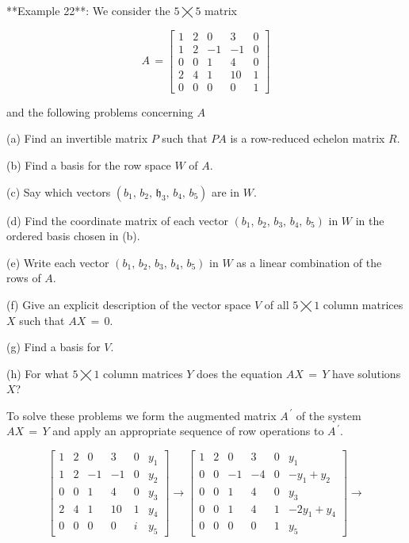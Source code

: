 

**Example 22**: We consider the \(5\bigtimes 5\) matrix

\[A\,=\begin{bmatrix}1&2&0&3&0\\ 1&2&-1&-1&0\\ 0&0&1&4&0\\ 2&4&1&10&1\\ 0&0&0&0&1\end{bmatrix}\]

and the following problems concerning \(A\)

(a) Find an invertible matrix \(P\) such that \(PA\) is a row-reduced echelon matrix \(R\).

(b) Find a basis for the row space \(W\) of \(A\).

(c) Say which vectors \((b_{1},\,b_{2},\,\mathfrak{h}_{3},\,b_{4},\,b_{5})\) are in \(W\).

(d) Find the coordinate matrix of each vector \((b_{1},\,b_{2},\,b_{3},\,b_{4},\,b_{5})\) in \(W\) in the ordered basis chosen in (b).

(e) Write each vector \((b_{1},\,b_{2},\,b_{3},\,b_{4},\,b_{5})\) in \(W\) as a linear combination of the rows of \(A\).

(f) Give an explicit description of the vector space \(V\) of all \(5\bigtimes 1\) column matrices \(X\) such that \(AX\,=\,0\).

(g) Find a basis for \(V\).

(h) For what \(5\bigtimes 1\) column matrices \(Y\) does the equation \(AX\,=\,Y\) have solutions \(X\)?

To solve these problems we form the augmented matrix \(A^{\,\prime}\) of the system \(AX\,=\,Y\) and apply an appropriate sequence of row operations to \(A^{\,\prime}\).

\[\begin{bmatrix}1&2&0&3&0&y_{1}\\ 1&2&-1&-1&0&y_{2}\\ 0&0&1&4&0&y_{3}\\ 2&4&1&10&1&y_{4}\\ 0&0&0&0&i&y_{5}\end{bmatrix}\longrightarrow\begin{bmatrix}1&2&0&3&0&y_{1}\\ 0&0&-1&-4&0&-y_{1}+y_{2}\\ 0&0&1&4&0&y_{3}\\ 0&0&1&4&1&-2y_{1}+y_{4}\\ 0&0&0&0&1&y_{5}\end{bmatrix}\longrightarrow\]


